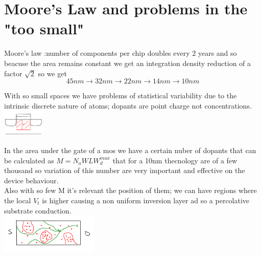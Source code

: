 \section{Moore's Law and problems in the "too small"}
Moore's law :number of components per chip doubles every 2 years and so beacuse the area remains constant we get an integration density reduction of a factor $\sqrt{2}$ so we get 
\begin{equation}
45nm \rightarrow 32nm \rightarrow 22nm \rightarrow 14nm \rightarrow 10nm
\end{equation}

\vspace{5mm}
With so small spaces we have problems of statistical variability due to the intrinsic discrete nature of atoms; dopants are point charge not concentrations.\\

\centering
\includegraphics[width=0.15\textwidth]{mosrand.png}\\
\raggedright

In the area under the gate of a mos we have a certain nuber of dopants that can be calculated as $M=N_aWLW_d^{max}$ that for a 10nm thecnology are of a few thousand so variation of this number are very important and effective on the device behaviour.\\
Also with so few M it's relevant the position of them; we can have regions where the local $V_t$ is higher causing a non uniform inversion layer ad so a percolative substrate conduction.\\ 


\centering
\includegraphics[width=0.35\textwidth]{percolative.png}\\
\raggedright

